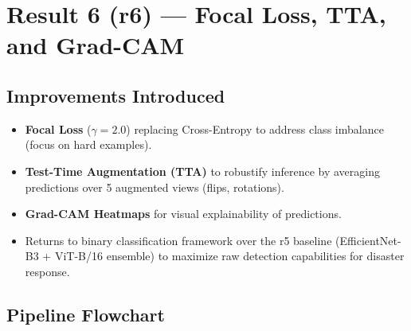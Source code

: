 \documentclass[12pt,a4paper]{article}
\begin{document}


\newpage
\section{Result 6 (r6) --- Focal Loss, TTA, and Grad-CAM}

\subsection{Improvements Introduced}
\begin{itemize}[nosep]
  \item \colorbox{newbox}{\textbf{Focal Loss}} ($\gamma=2.0$) replacing Cross-Entropy to address class imbalance (focus on hard examples).
  \item \colorbox{newbox}{\textbf{Test-Time Augmentation (TTA)}} to robustify inference by averaging predictions over 5 augmented views (flips, rotations).
  \item \colorbox{newbox}{\textbf{Grad-CAM Heatmaps}} for visual explainability of predictions.
  \item Returns to binary classification framework over the r5 baseline (EfficientNet-B3 + ViT-B/16 ensemble) to maximize raw detection capabilities for disaster response.
\end{itemize}

\subsection{Pipeline Flowchart}
\end{document}
